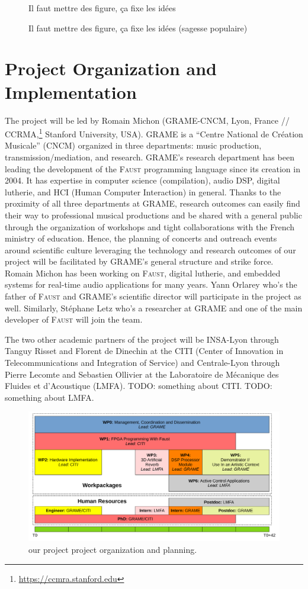 \documentclass[a4paper,10pt]{article}
\newcommand{\F}{\textsc{Faust}}
\newcommand{\PP}{our project}
\begin{document}
\begin{figure}[h]
  \centerline{Il faut mettre des figure, ça fixe les idées}
    \caption{Il faut mettre des figure, ça fixe les idées (sagesse populaire)}
\label{fig1}
\end{figure}

\section*{Project Organization and Implementation}

The project will be led by Romain Michon (GRAME-CNCM, Lyon, France // CCRMA,\footnote{\url{https://ccmra.stanford.edu}} Stanford University, USA). GRAME is a ``Centre National de Création Musicale'' (CNCM) organized in three departments: music production, transmission/mediation, and research. GRAME's research department has been leading the development of the \F{} programming language since its creation in 2004. It has expertise in computer science (compilation), audio DSP, digital lutherie, and HCI (Human Computer Interaction) in general. Thanks to the proximity of all three departments at GRAME, research outcomes can easily find their way to professional musical productions and be shared with a general public through the organization of workshops and tight collaborations with the French ministry of education. Hence, the planning of concerts and outreach events around scientific culture leveraging the technology and research outcomes of \PP{} will be facilitated by GRAME's general structure and strike force. Romain Michon has been working on \F{}, digital lutherie, and embedded systems for real-time audio applications for many years. Yann Orlarey who's the father of \F{} and GRAME's scientific director will participate in the project as well. Similarly, Stéphane Letz who's a researcher at GRAME and one of the main developer of \F{} will join the team. 

The two other academic partners of the project will be INSA-Lyon through Tanguy Risset and Florent de Dinechin at the CITI (Center of Innovation in Telecommunications and Integration of Service) and Centrale-Lyon through Pierre Lecomte and Sebastien Ollivier at the Laboratoire de Mécanique des Fluides et d'Acoustique (LMFA). TODO: something about CITI. TODO: something about LMFA.

\begin{figure}[h]
  \centering
  \includegraphics[width=\columnwidth]{img/wp}
  \caption{\PP{} project organization and planning.}
  \label{fig:wp}
\end{figure}
\end{document}
